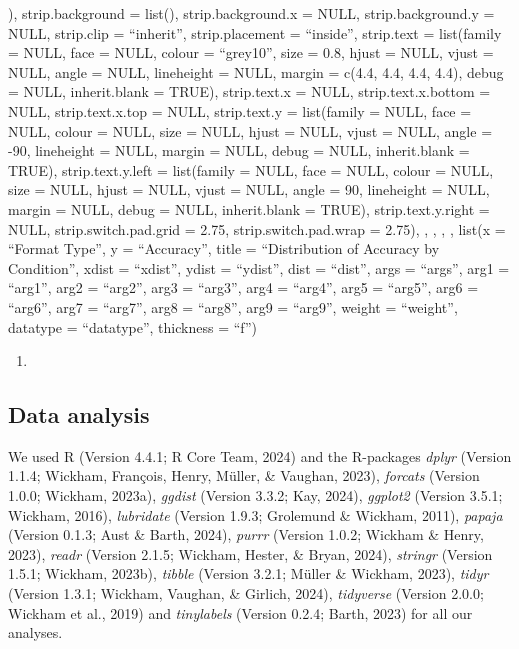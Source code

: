 \documentclass[
  man,floatsintext]{apa6}
\begin{document}
), strip.background = list(), strip.background.x = NULL, strip.background.y = NULL, strip.clip = ``inherit'', strip.placement = ``inside'', strip.text = list(family = NULL, face = NULL, colour = ``grey10'', size = 0.8, hjust = NULL, vjust = NULL, angle = NULL, lineheight = NULL, margin = c(4.4, 4.4, 4.4, 4.4), debug = NULL, inherit.blank = TRUE), strip.text.x = NULL, strip.text.x.bottom = NULL, strip.text.x.top = NULL, strip.text.y = list(family = NULL, face = NULL, colour = NULL, size = NULL, hjust = NULL,
vjust = NULL, angle = -90, lineheight = NULL, margin = NULL, debug = NULL, inherit.blank = TRUE), strip.text.y.left = list(family = NULL, face = NULL, colour = NULL, size = NULL, hjust = NULL, vjust = NULL, angle = 90, lineheight = NULL, margin = NULL, debug = NULL, inherit.blank = TRUE), strip.text.y.right = NULL, strip.switch.pad.grid = 2.75, strip.switch.pad.wrap = 2.75), , , , , list(x = ``Format Type'', y = ``Accuracy'', title = ``Distribution of Accuracy by Condition'', xdist = ``xdist'', ydist = ``ydist'', dist = ``dist'', args = ``args'', arg1 = ``arg1'', arg2 = ``arg2'', arg3 = ``arg3'', arg4 = ``arg4'', arg5 = ``arg5'', arg6 = ``arg6'', arg7 = ``arg7'', arg8 = ``arg8'', arg9 = ``arg9'', weight = ``weight'', datatype = ``datatype'', thickness = ``f'')

\begin{enumerate}
\def\labelenumi{\arabic{enumi}.}
\setcounter{enumi}{1}
\item
  \newpage
\end{enumerate}

\subsection{Data analysis}\label{data-analysis}

We used R (Version 4.4.1; R Core Team, 2024) and the R-packages \emph{dplyr} (Version 1.1.4; Wickham, François, Henry, Müller, \& Vaughan, 2023), \emph{forcats} (Version 1.0.0; Wickham, 2023a), \emph{ggdist} (Version 3.3.2; Kay, 2024), \emph{ggplot2} (Version 3.5.1; Wickham, 2016), \emph{lubridate} (Version 1.9.3; Grolemund \& Wickham, 2011), \emph{papaja} (Version 0.1.3; Aust \& Barth, 2024), \emph{purrr} (Version 1.0.2; Wickham \& Henry, 2023), \emph{readr} (Version 2.1.5; Wickham, Hester, \& Bryan, 2024), \emph{stringr} (Version 1.5.1; Wickham, 2023b), \emph{tibble} (Version 3.2.1; Müller \& Wickham, 2023), \emph{tidyr} (Version 1.3.1; Wickham, Vaughan, \& Girlich, 2024), \emph{tidyverse} (Version 2.0.0; Wickham et al., 2019) and \emph{tinylabels} (Version 0.2.4; Barth, 2023) for all our analyses.
\end{document}
